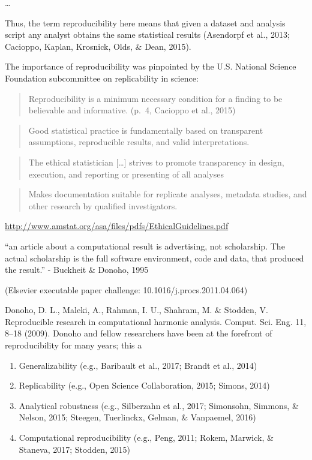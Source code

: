 \documentclass[man,floatsintext]{apa6}
\providecommand{\tightlist}{%
  \setlength{\itemsep}{0pt}\setlength{\parskip}{0pt}}
\theoremstyle{definition}
\theoremstyle{definition}
\theoremstyle{definition}
\theoremstyle{remark}
\begin{document}
\ldots{}

Thus, the term reproducibility here means that given a dataset and
analysis script any analyst obtains the same statistical results
(Asendorpf et al., 2013; Cacioppo, Kaplan, Krosnick, Olds, \& Dean,
2015).

The importance of reproducibility was pinpointed by the U.S. National
Science Foundation subcommittee on replicability in science:

\begin{quote}
Reproducibility is a minimum necessary condition for a finding to be
believable and informative. (p.~4, Cacioppo et al., 2015)
\end{quote}

\begin{quote}
Good statistical practice is fundamentally based on transparent
assumptions, reproducible results, and valid interpretations.
\end{quote}

\begin{quote}
The ethical statistician {[}\ldots{}{]} strives to promote transparency
in design, execution, and reporting or presenting of all analyses
\end{quote}

\begin{quote}
Makes documentation suitable for replicate analyses, metadata studies,
and other research by qualified investigators.
\end{quote}

\url{http://www.amstat.org/asa/files/pdfs/EthicalGuidelines.pdf}

\enquote{an article about a computational result is advertising, not
scholarship. The actual scholarship is the full software environment,
code and data, that produced the result.} - Buckheit \& Donoho, 1995

(Elsevier executable paper challenge: 10.1016/j.procs.2011.04.064)

Donoho, D. L., Maleki, A., Rahman, I. U., Shahram, M. \& Stodden, V.
Reproducible research in computational harmonic analysis. Comput. Sci.
Eng. 11, 8--18 (2009). Donoho and fellow researchers have been at the
forefront of reproducibility for many years; this a

\begin{enumerate}
\def\labelenumi{\arabic{enumi}.}
\tightlist
\item
  Generalizability (e.g., Baribault et al., 2017; Brandt et al., 2014)
\item
  Replicability (e.g., Open Science Collaboration, 2015; Simons, 2014)
\item
  Analytical robustness (e.g., Silberzahn et al., 2017; Simonsohn,
  Simmons, \& Nelson, 2015; Steegen, Tuerlinckx, Gelman, \& Vanpaemel,
  2016)
\item
  Computational reproducibility (e.g., Peng, 2011; Rokem, Marwick, \&
  Staneva, 2017; Stodden, 2015)
\end{enumerate}
\end{document}
